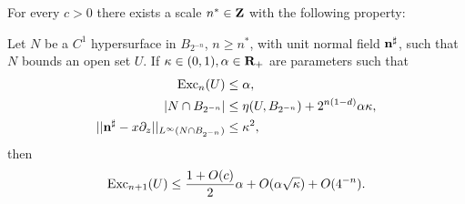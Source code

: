 \begin{lemma}\label{DGL2}
For every $c > 0$ there exists a scale $n^* \in \mathbf{Z}$ with the following property:

Let $N$ be a $C^1$ hypersurface in $B_{2^{-n}}$, $n \geq n^*$, with unit normal field $\mathbf n^\sharp$, such that $N$ bounds an open set $U$.
If $\kappa \in (0, 1), \alpha \in \mathbf{R}_+$ are parameters such that
\begin{align}
\operatorname{Exc}_n(U) &\leq \alpha, \label{DGL2 1}\\
|N \cap B_{2^{-n}}| &\leq \eta(U, B_{2^{-n}}) + 2^{n(1 - d)}\alpha \kappa, \label{DGL2 2}\\
||\mathbf n^\sharp - x\partial_z||_{L^\infty(N \cap B_{2^{-n}})} &\leq \kappa^2, \label{DGL2 3}
\end{align}
then
$$\operatorname{Exc}_{n + 1}(U) \leq \frac{1 + O(c)}{2} \alpha + O(\alpha \sqrt \kappa) + O(4^{-n}).$$
\end{lemma}
